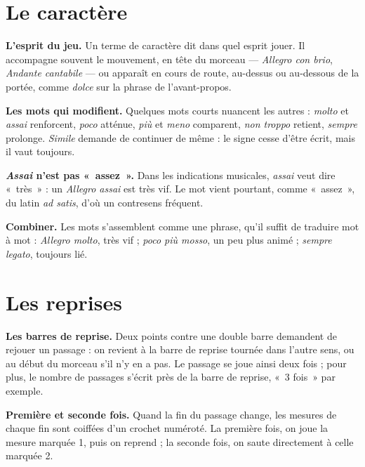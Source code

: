 \documentclass[a4paper,11pt]{article}
\newcommand{\tableau}[1]{%
  \par\medskip
  {\centering\small\par}
  \medskip
}
\begin{document}
\section{Le caractère}
\label{sec:caractere}

\textbf{L'esprit du jeu.} Un terme de caractère dit dans quel esprit jouer. Il
accompagne souvent le mouvement, en tête du morceau --- \emph{Allegro con brio},
\emph{Andante cantabile} --- ou apparaît en cours de route, au-dessus ou
au-dessous de la portée, comme \emph{dolce} sur la phrase de l'avant-propos.

\tableau{caractere}

\textbf{Les mots qui modifient.} Quelques mots courts nuancent les autres :
\emph{molto} et \emph{assai} renforcent, \emph{poco} atténue, \emph{più} et
\emph{meno} comparent, \emph{non troppo} retient, \emph{sempre} prolonge.
\emph{Simile} demande de continuer de même : le signe cesse d'être écrit, mais
il vaut toujours.

\tableau{modificateurs}

\begin{remarque}
\textbf{\emph{Assai} n'est pas «~assez~».} Dans les indications musicales,
\emph{assai} veut dire «~très~» : un \emph{Allegro assai} est très vif. Le mot
vient pourtant, comme «~assez~», du latin \emph{ad satis}, d'où un contresens
fréquent.
\end{remarque}

\textbf{Combiner.} Les mots s'assemblent comme une phrase, qu'il suffit de
traduire mot à mot : \emph{Allegro molto}, très vif ; \emph{poco più mosso}, un
peu plus animé ; \emph{sempre legato}, toujours lié.

\section{Les reprises}
\label{sec:reprises}

\textbf{Les barres de reprise.} Deux points contre une double barre demandent de
rejouer un passage : on revient à la barre de reprise tournée dans l'autre
sens, ou au début du morceau s'il n'y en a pas. Le passage se joue ainsi deux
fois ; pour plus, le nombre de passages s'écrit près de la barre de reprise,
«~3 fois~» par exemple.

\textbf{Première et seconde fois.} Quand la fin du passage change, les mesures
de chaque fin sont coiffées d'un crochet numéroté. La première fois, on joue la
mesure marquée 1, puis on reprend ; la seconde fois, on saute directement à
celle marquée 2.
\end{document}
